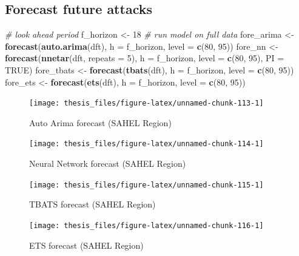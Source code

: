 \documentclass[11pt,oneside,a4paper]{reedthesis}
\newenvironment{Shaded}{\begin{snugshade}}{\end{snugshade}}
\newcommand{\KeywordTok}[1]{\textcolor[rgb]{0.13,0.29,0.53}{\textbf{#1}}}
\newcommand{\DataTypeTok}[1]{\textcolor[rgb]{0.13,0.29,0.53}{#1}}
\newcommand{\DecValTok}[1]{\textcolor[rgb]{0.00,0.00,0.81}{#1}}
\newcommand{\StringTok}[1]{\textcolor[rgb]{0.31,0.60,0.02}{#1}}
\newcommand{\CommentTok}[1]{\textcolor[rgb]{0.56,0.35,0.01}{\textit{#1}}}
\newcommand{\OtherTok}[1]{\textcolor[rgb]{0.56,0.35,0.01}{#1}}
\newcommand{\NormalTok}[1]{#1}
\begin{document}
\subsection{Forecast future attacks}\label{forecast-future-attacks}
\begin{Shaded}
\begin{Highlighting}[]
\CommentTok{# look ahead period }
\NormalTok{f_horizon <-}\StringTok{ }\DecValTok{18}
\CommentTok{# run model on full data}
\NormalTok{fore_arima <-}\StringTok{ }\KeywordTok{forecast}\NormalTok{(}\KeywordTok{auto.arima}\NormalTok{(dft), }\DataTypeTok{h =}\NormalTok{ f_horizon, }\DataTypeTok{level =} \KeywordTok{c}\NormalTok{(}\DecValTok{80}\NormalTok{, }\DecValTok{95}\NormalTok{))}
\NormalTok{fore_nn <-}\StringTok{ }\KeywordTok{forecast}\NormalTok{(}\KeywordTok{nnetar}\NormalTok{(dft, }\DataTypeTok{repeats =} \DecValTok{5}\NormalTok{), }\DataTypeTok{h =}\NormalTok{ f_horizon, }
                    \DataTypeTok{level =} \KeywordTok{c}\NormalTok{(}\DecValTok{80}\NormalTok{, }\DecValTok{95}\NormalTok{), }\DataTypeTok{PI =} \OtherTok{TRUE}\NormalTok{)}
\NormalTok{fore_tbats <-}\StringTok{ }\KeywordTok{forecast}\NormalTok{(}\KeywordTok{tbats}\NormalTok{(dft), }\DataTypeTok{h =}\NormalTok{ f_horizon, }\DataTypeTok{level =} \KeywordTok{c}\NormalTok{(}\DecValTok{80}\NormalTok{, }\DecValTok{95}\NormalTok{))}
\NormalTok{fore_ets <-}\StringTok{ }\KeywordTok{forecast}\NormalTok{(}\KeywordTok{ets}\NormalTok{(dft), }\DataTypeTok{h =}\NormalTok{ f_horizon, }\DataTypeTok{level =} \KeywordTok{c}\NormalTok{(}\DecValTok{80}\NormalTok{, }\DecValTok{95}\NormalTok{))}
\end{Highlighting}
\end{Shaded}
\begin{figure}
\texttt{[image: thesis\_files/figure-latex/unnamed-chunk-113-1]} \caption{Auto Arima forecast (SAHEL Region)}\label{fig:unnamed-chunk-113}
\end{figure}
\begin{figure}
\texttt{[image: thesis\_files/figure-latex/unnamed-chunk-114-1]} \caption{Neural Network forecast (SAHEL Region)}\label{fig:unnamed-chunk-114}
\end{figure}
\begin{figure}
\texttt{[image: thesis\_files/figure-latex/unnamed-chunk-115-1]} \caption{TBATS forecast (SAHEL Region)}\label{fig:unnamed-chunk-115}
\end{figure}
\begin{figure}
\texttt{[image: thesis\_files/figure-latex/unnamed-chunk-116-1]} \caption{ETS forecast (SAHEL Region)}\label{fig:unnamed-chunk-116}
\end{figure}
\end{document}
